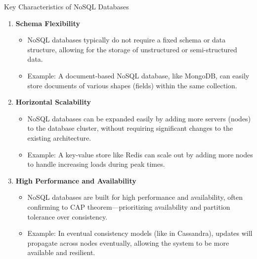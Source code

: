 \documentclass[aspectratio=169]{beamer}
\begin{document}
\begin{frame}[fragile]{Key Characteristics of NoSQL Databases}
    \begin{enumerate}
        \item \textbf{Schema Flexibility}
            \begin{itemize}
                \item NoSQL databases typically do not require a fixed schema or data structure, allowing for the storage of unstructured or semi-structured data.
                \item Example: A document-based NoSQL database, like MongoDB, can easily store documents of various shapes (fields) within the same collection.
            \end{itemize}
        
        \item \textbf{Horizontal Scalability}
            \begin{itemize}
                \item NoSQL databases can be expanded easily by adding more servers (nodes) to the database cluster, without requiring significant changes to the existing architecture.
                \item Example: A key-value store like Redis can scale out by adding more nodes to handle increasing loads during peak times.
            \end{itemize}
        
        \item \textbf{High Performance and Availability}
            \begin{itemize}
                \item NoSQL databases are built for high performance and availability, often confirming to CAP theorem—prioritizing availability and partition tolerance over consistency.
                \item Example: In eventual consistency models (like in Cassandra), updates will propagate across nodes eventually, allowing the system to be more available and resilient.
            \end{itemize}
    \end{enumerate}
\end{frame}
\end{document}
